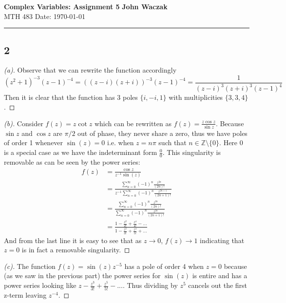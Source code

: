 \documentclass[a4paper, 11pt]{article}
\begin{document}
\noindent
\large\textbf{Complex Variables: Assignment 5} \hfill \textbf{John Waczak} \\
\normalsize MTH 483 \hfill  Date: \today \\
\par\noindent\rule{\textwidth}{0.4pt}

\subsection*{2}
	\begin{proof}[(a)]
		Observe that we can rewrite the function accordingly 
			\begin{equation*}
				(z^2+1)^{-3}(z-1)^{-4}=((z-i)(z+i))^{-3}(z-1)^{-4} = \frac{1}{(z-i)^3(z+i)^3(z-1)^4}
			\end{equation*}
		Then it is clear that the function has 3 poles $\{i, -i, 1\}$ with multiplicities $\{3, 3, 4\}$. 
	\end{proof}
	
	\begin{proof}[(b)]
		Consider $f(z) = z\cot z$ which can be rewritten as $f(z) = \frac{z\cos z}{\sin z}$. Because $\sin z$ and $\cos z$ are $\pi/2$ out of phase, they never share a zero, thus we have poles of order 1 whenever $\sin(z) = 0$ i.e. when $z=n\pi$ such that $n\in\mathbb{Z}\setminus\{0\}$. Here $0$ is a special case as we have the indeterminant form $\frac{0}{0}$. This singularity is removable as can be seen by the power series:
			\begin{align*}
				f(z) &= \frac{\cos z}{z^{-1}\sin(z)} \\ 
					&= \frac{\sum\limits_{n=0}^{\infty}(-1)^n\frac{z^{2n}}{(2n)!}}{z^{-1}\sum\limits_{n=0}^{\infty}(-1)^n\frac{z^{2n+1}}{(2n+1)!}} \\ 
					&= \frac{\sum\limits_{n=0}^{\infty}(-1)^n\frac{z^{2n}}{(2n)!}}{\sum\limits_{n=0}^{\infty}(-1)^n\frac{z^{2n}}{(2n+1)!}} \\ 
					&= \frac{1-\frac{z^2}{2!}+\frac{z^4}{4!}-...}{1-\frac{z^2}{3!}+\frac{z^4}{5!}+...}
			\end{align*}
		And from the last line it is easy to see that as $z\to 0$, $f(z)\to 1$ indicating that $z=0$ is in fact a removable singularity. 
	\end{proof}
	
	\begin{proof}[(c)]
		The function $f(z) = \sin(z)z^{-5}$ has a pole of order 4 when $z=0$ because (as we saw in the previous part) the power series for $\sin(z)$ is entire and has a power series looking like $z-\frac{z^3}{3!}+\frac{z^5}{5!}-...$. Thus dividing by $z^5$ cancels out the first z-term leaving $z^{-4}$.  
	\end{proof}
	
\end{document}
